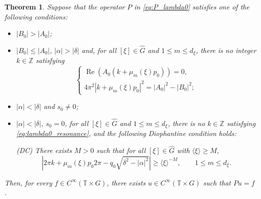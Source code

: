 \documentclass[10pt,a4paper]{amsart}
\newtheorem{theorem}{Theorem}
\begin{document}
	\begin{theorem}\label{thm:lambda0_cases}
		Suppose that the operator $P$ in \eqref{eq:P_lambda0} satisfies one of the following conditions:
		\begin{itemize}
			\item[(1)] $|B_0| > |A_0|$;
			\item[(2)] $|B_0| \le |A_0|$, $|\alpha| > |\delta|$ and, for all $[\xi] \in \widehat{G}$ and $1 \le m \le d_\xi$, there is no integer $k \in \mathbb{Z}$ satisfying
			\begin{equation}\label{eq:lambda0_resonance}
				\begin{cases}
					\operatorname{Re}(A_0(k + \mu_m(\xi)p_0)) = 0, \\
					4\pi^2 |k + \mu_m(\xi)p_0|^2 = |A_0|^2 - |B_0|^2;
				\end{cases}
			\end{equation}
			\item[(3)] $|\alpha| < |\delta|$ and $s_0 \neq 0$;
			\item[(4)] $|\alpha| < |\delta|$, $s_0 = 0$, for all $[\xi] \in \widehat{G}$ and $1 \le m \le d_\xi$, there is no $k \in \mathbb{Z}$ satisfying \eqref{eq:lambda0_resonance}, and the following Diophantine condition holds:
			
			\medskip\noindent
			\textup{(DC)} There exists $M > 0$ such that for all $[\xi] \in \widehat{G}$ with $\langle\xi\rangle \ge M$,
			\[
			|2\pi k + \mu_m(\xi)p_0 2\pi - q_0\sqrt{\delta^2 - |\alpha|^2}| \ge \langle\xi\rangle^{-M},
			\qquad 1 \le m \le d_\xi.
			\]
		\end{itemize}
		
		Then, for every $f \in C^\infty(\mathbb{T} \times G)$, there exists $u \in C^\infty(\mathbb{T} \times G)$ such that $Pu = f$.
	\end{theorem}
\end{document}
